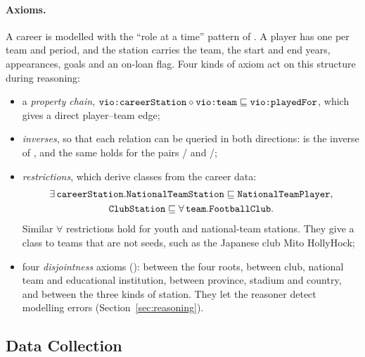 \paragraph{Axioms.} A career is modelled with the ``role at a time'' pattern
of . A player has one  per
team and period, and the station carries the team, the start and end years,
appearances, goals and an on-loan flag. Four kinds of axiom act on this
structure during reasoning:
\begin{itemize}
  \item a \emph{property chain},
        $\term{vio:careerStation} \circ \term{vio:team} \sqsubseteq \term{vio:playedFor}$,
        which gives a direct player--team edge;
  \item \emph{inverses}, so that each relation can be queried in both
        directions:  is the inverse of
        , and the same holds for the pairs
        / and
        /;
  \item \emph{restrictions}, which derive classes from the career data:
        \begin{gather*}
          \exists\,\term{careerStation}.\term{NationalTeamStation} \sqsubseteq \term{NationalTeamPlayer},\\
          \term{ClubStation} \sqsubseteq \forall\,\term{team}.\term{FootballClub}.
        \end{gather*}
        Similar $\forall$ restrictions hold for youth and national-team
        stations. They give a class to teams that are not seeds, such as the
        Japanese club Mito HollyHock;
  \item four \emph{disjointness} axioms (): between
        the four roots, between club, national team and educational
        institution, between province, stadium and country, and between the
        three kinds of station. They let the reasoner detect modelling errors
        (Section~\ref{sec:reasoning}).
\end{itemize}

\subsection{Data Collection}
\label{sec:collection}

